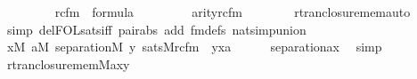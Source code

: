 \begin{isabellebody}
\ \ \ \ \isanewline
\ \ \ \ {\isachardoublequoteopen}rcfm{\isacharparenleft}{\kern0pt}{}{\isacharcomma}{\kern0pt}{}{\isacharcomma}{\kern0pt}{}{\isacharparenright}{\kern0pt}\ {\isasymin}\ formula{\isachardoublequoteclose}\isanewline
\ \ \ \ \isanewline
\ \ \ \ {\isachardoublequoteopen}arity{\isacharparenleft}{\kern0pt}rcfm{\isacharparenleft}{\kern0pt}{}{\isacharcomma}{\kern0pt}{}{\isacharcomma}{\kern0pt}{}{\isacharparenright}{\kern0pt}{\isacharparenright}{\kern0pt}\ {\isacharequal}{\kern0pt}\ {}{\isachardoublequoteclose}\isanewline
\ \ \ \ \isamarkupfalse%
\ rtran{\isacharunderscore}{\kern0pt}closure{\isacharunderscore}{\kern0pt}mem{\isacharunderscore}{\kern0pt}auto\ \isamarkupfalse%
\ {\isacharparenleft}{\kern0pt}simp\ del{\isacharcolon}{\kern0pt}FOL{\isacharunderscore}{\kern0pt}sats{\isacharunderscore}{\kern0pt}iff\ pair{\isacharunderscore}{\kern0pt}abs\ add{\isacharcolon}{\kern0pt}\ fm{\isacharunderscore}{\kern0pt}defs\ nat{\isacharunderscore}{\kern0pt}simp{\isacharunderscore}{\kern0pt}union{\isacharparenright}{\kern0pt}\isanewline
\ \ \isamarkupfalse%
\isanewline
\ \ \isamarkupfalse%
\ {\isachardoublequoteopen}{\isasymforall}x{\isasymin}M{\isachardot}{\kern0pt}\ {\isasymforall}a{\isasymin}M{\isachardot}{\kern0pt}\ separation{\isacharparenleft}{\kern0pt}{\isacharhash}{\kern0pt}{\isacharhash}{\kern0pt}M{\isacharcomma}{\kern0pt}\ {\isasymlambda}y{\isachardot}{\kern0pt}\ sats{\isacharparenleft}{\kern0pt}M{\isacharcomma}{\kern0pt}rcfm{\isacharparenleft}{\kern0pt}{}{\isacharcomma}{\kern0pt}{}{\isacharcomma}{\kern0pt}{}{\isacharparenright}{\kern0pt}\ {\isacharcomma}{\kern0pt}\ {\isacharbrackleft}{\kern0pt}y{\isacharcomma}{\kern0pt}x{\isacharcomma}{\kern0pt}a{\isacharbrackright}{\kern0pt}{\isacharparenright}{\kern0pt}{\isacharparenright}{\kern0pt}{\isachardoublequoteclose}\isanewline
\ \ \ \ \isamarkupfalse%
\ separation{\isacharunderscore}{\kern0pt}ax\ \isamarkupfalse%
\ simp\isanewline
\ \ \isamarkupfalse%
\isanewline
\ \ \isamarkupfalse%
\ {\isachardoublequoteopen}{\isacharparenleft}{\kern0pt}rtran{\isacharunderscore}{\kern0pt}closure{\isacharunderscore}{\kern0pt}mem{\isacharparenleft}{\kern0pt}{\isacharhash}{\kern0pt}{\isacharhash}{\kern0pt}M{\isacharcomma}{\kern0pt}a{\isacharcomma}{\kern0pt}x{\isacharcomma}{\kern0pt}y{\isacharparenright}{\kern0pt}{\isacharparenright}{\kern0pt}\isanewline

\end{isabellebody}
